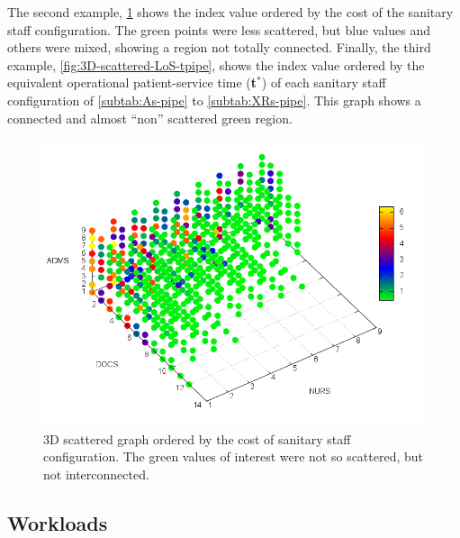 \documentclass[11pt]{article} %
\begin{document}
 The second example, \ref{fig:3D-scattered-LoS-cost} shows the index
value ordered by the cost of the sanitary staff configuration. The
green points were less scattered, but blue values and others were
mixed, showing a region not totally connected. Finally, the third
example, \ref{fig:3D-scattered-LoS-tpipe}, shows the index value
ordered by the equivalent operational patient-service time ({\bf t$^*$})
of each sanitary staff configuration of \ref{subtab:As-pipe} to \ref{subtab:XRs-pipe}.
This graph shows a connected and almost ``non'' scattered green
region. %

\begin{figure}[h]
\noindent \begin{centering}
\includegraphics[width=0.88\columnwidth,height=0.2\paperheight]{figs4/3D-scatter-LoS-$2}
\par\end{centering}

\caption{3D scattered graph ordered by the cost of sanitary staff configuration.
The green values of interest were not so scattered, but not interconnected.\label{fig:3D-scattered-LoS-cost} }


\end{figure}

\subsection{Workloads}
\label{ssec:sabadell3}
\end{document}
